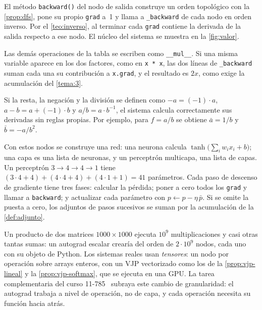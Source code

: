 El método \texttt{backward()} del nodo de salida construye un orden topológico con la \cref{prop:dfs}, pone su propio \texttt{grad} a~1 y llama a \texttt{\_backward} de cada nodo en orden inverso. Por el \cref{teo:inverso}, al terminar cada \texttt{grad} contiene la derivada de la salida respecto a ese nodo. El núcleo del sistema se muestra en la \cref{fig:valor}.

\addtocounter{figure}{1}%

Las demás operaciones de la tabla se escriben como \texttt{\_\_mul\_\_}. Si una misma variable aparece en los dos factores, como en \texttt{x * x}, las dos líneas de \texttt{\_backward} suman cada una su contribución a \texttt{x.grad}, y el resultado es $2x$, como exige la acumulación del \cref{tema:3}.

\begin{proposicion}\label{prop:derivadas}
Si la resta, la negación y la división se definen como $-a=(-1)\cdot a$, $a-b=a+(-1)\cdot b$ y $a/b=a\cdot b^{-1}$, el sistema calcula correctamente sus derivadas sin reglas propias. Por ejemplo, para $f=a/b$ se obtiene $\bar a=1/b$ y $\bar b=-a/b^{2}$.
\end{proposicion}

\addtocounter{definicion}{1}%

Con estos nodos se construye una red: una neurona calcula $\tanh\bigl(\sum_iw_ix_i+b\bigr)$; una capa es una lista de neuronas, y un perceptrón multicapa, una lista de capas. Un perceptrón $3\to 4\to 4\to 1$ tiene $(3\cdot 4+4)+(4\cdot 4+4)+(4\cdot 1+1)=41$ parámetros. Cada paso de descenso de gradiente tiene tres fases: calcular la pérdida; poner a cero todos los \texttt{grad} y llamar a \texttt{backward}; y actualizar cada parámetro con $p\gets p-\eta\,\bar p$. Si se omite la puesta a cero, los adjuntos de pasos sucesivos se suman por la acumulación de la \cref{def:adjunto}.

\begin{observacion}
Un producto de dos matrices $1000\times 1000$ ejecuta $10^{9}$ multiplicaciones y casi otras tantas sumas: un autograd escalar crearía del orden de $2\cdot 10^{9}$ nodos, cada uno con su objeto de Python. Los sistemas reales usan \emph{tensores}: un nodo por operación sobre arrays enteros, con un VJP vectorizado como los de la \cref{prop:vjp-lineal} y la \cref{prop:vjp-softmax}, que se ejecuta en una GPU. La tarea complementaria del curso 11-785~\cite[§1 y §3.2]{cmu11785} subraya este cambio de granularidad: el autograd trabaja a nivel de operación, no de capa, y cada operación necesita su función hacia atrás.
\end{observacion}

